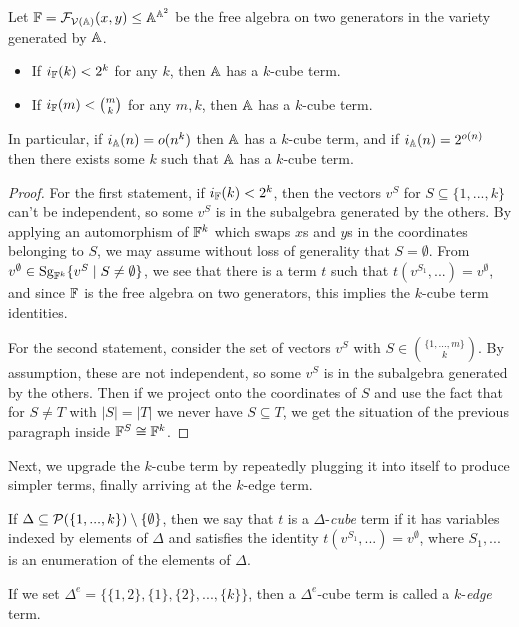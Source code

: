 \documentclass[letterpaper,11pt]{article}
\DeclareMathOperator{\Sg}{Sg}
\begin{document}
\begin{thm} Let $\mathbb{F} = \mathcal{F}_{\mathcal{V}(\mathbb{A})}(x,y) \le \mathbb{A}^{\mathbb{A}^2}$ be the free algebra on two generators in the variety generated by $\mathbb{A}$.
\begin{itemize}
\item If $i_{\mathbb{F}}(k) < 2^k$ for any $k$, then $\mathbb{A}$ has a $k$-cube term.

\item If $i_{\mathbb{F}}(m) < \binom{m}{k}$ for any $m,k$, then $\mathbb{A}$ has a $k$-cube term.
\end{itemize}
In particular, if $i_{\mathbb{A}}(n) = o(n^k)$ then $\mathbb{A}$ has a $k$-cube term, and if $i_{\mathbb{A}}(n) = 2^{o(n)}$ then there exists some $k$ such that $\mathbb{A}$ has a $k$-cube term.
\end{thm}
\begin{proof} For the first statement, if $i_{\mathbb{F}}(k) < 2^k$, then the vectors $v^S$ for $S \subseteq \{1, ..., k\}$ can't be independent, so some $v^S$ is in the subalgebra generated by the others. By applying an automorphism of $\mathbb{F}^k$ which swaps $x$s and $y$s in the coordinates belonging to $S$, we may assume without loss of generality that $S = \emptyset$. From $v^\emptyset \in \Sg_{\bF^k}\{v^S \mid S \ne \emptyset\}$, we see that there is a term $t$ such that $t(v^{S_1}, ...) = v^\emptyset$, and since $\mathbb{F}$ is the free algebra on two generators, this implies the $k$-cube term identities.

For the second statement, consider the set of vectors $v^S$ with $S \in \binom{\{1, ..., m\}}{k}$. By assumption, these are not independent, so some $v^S$ is in the subalgebra generated by the others. Then if we project onto the coordinates of $S$ and use the fact that for $S \ne T$ with $|S| = |T|$ we never have $S \subseteq T$, we get the situation of the previous paragraph inside $\mathbb{F}^S \cong \mathbb{F}^k$.
\end{proof}

Next, we upgrade the $k$-cube term by repeatedly plugging it into itself to produce simpler terms, finally arriving at the $k$-edge term.

\begin{defn} If $\Delta \subseteq \mathcal{P}(\{1, ..., k\}) \setminus \{\emptyset\}$, then we say that $t$ is a $\Delta$-\emph{cube} term if it has variables indexed by elements of $\Delta$ and satisfies the identity $t(v^{S_1}, ...) = v^\emptyset$, where $S_1, ...$ is an enumeration of the elements of $\Delta$.

If we set $\Delta^e = \{\{1,2\}, \{1\}, \{2\}, ..., \{k\}\}$, then a $\Delta^e$-cube term is called a $k$-\emph{edge} term.
\end{defn}
\end{document}
